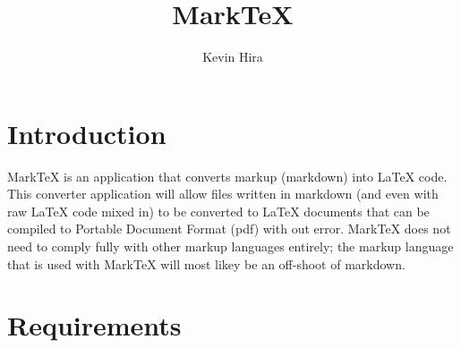 \documentclass[10pt, a4paper]{article}
\title{MarkTeX}
\author{Kevin Hira}
\begin{document}
\maketitle

\section*{Introduction}
MarkTeX is an application that converts markup (markdown) into \LaTeX{} code. This converter application will allow files written in markdown (and even with raw \LaTeX{} code mixed in) to be converted to \LaTeX{} documents that can be compiled to Portable Document Format (pdf) with out error. MarkTeX does not need to comply fully with other markup languages entirely; the markup language that is used with MarkTeX will most likey be an off-shoot of markdown.

\pagebreak

\section{Requirements}
\end{document}
